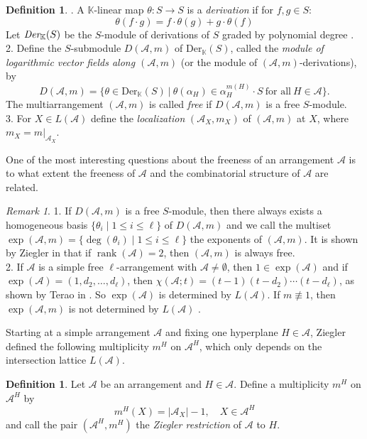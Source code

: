 \documentclass[12pt]{amsart}
\theoremstyle{definition}
\newtheorem{definition}[theorem]{Definition}
\theoremstyle{remark}
\newtheorem{remark}[theorem]{Remark}
\newcommand{\rank}{\operatorname{rank}}
\newcommand\CA{{\mathscr A}}
\begin{document}
\begin{definition}
. A $\mathbb{K}$-linear map $\theta: S \rightarrow S$ is a \emph{derivation} if for $f,g \in S$: \[\theta(f\cdot g) = f\cdot \theta(g)+g\cdot \theta(f)\] Let $\emph{Der}_{\mathbb{K}}(S)$ be the $S$-module of derivations of $S$ graded by polynomial degree \cite[Def.~4.1]{MR1217488}. \\ 2. Define the $S$-submodule $D(\CA,m)$ of $\text{Der}_{\mathbb{K}}(S)$, called the \emph{module of logarithmic vector fields along $(\CA,m)$} (or the module of $(\CA,m)$-derivations), by \[D(\CA,m) = \{\theta \in \text{Der}_{\mathbb{K}}(S)~\vert ~ \theta(\alpha_H)\in \alpha_H^{m(H)}\cdot S~\text{for all}~H\in \CA\}.\]
	The multiarrangement $(\CA,m)$ is called \emph{free} if $D(\CA,m)$ is a free $S$-module.\\
3. For $X\in L(\CA)$ define the \emph{localization} $(\CA_X,m_X)$ of $(\CA,m)$ at $X$, where $m_X=m\vert_{\CA_X}$.
\end{definition}

One of the most interesting questions about the freeness of an arrangement $\CA$ is to what extent the freeness of $\CA$ and the combinatorial structure of $\CA$ are related.
 
 \begin{remark}
 1. If $D(\CA,m)$ is a free $S$-module, then there always exists a homogeneous basis $\{\theta_i\mid 1\leq i\leq \ell\}$ of $D(\CA,m)$ and we call the multiset $\exp(\CA,m)=\{\deg(\theta_i)\mid 1\leq i\leq \ell\}$ the exponents of $(\CA,m)$. It is shown by Ziegler in \cite[Cor.~7]{MR1000610} that if $\rank(\CA)=2$, then $(\CA,m)$ is always free.\\
 2. If $\CA$ is a simple free $\ell$-arrangement with $\CA\neq\emptyset$, then $1\in\exp(\CA)$ \cite[Prop.~4.27]{MR1217488} and if $\exp(\CA)=(1,d_2,\dots,d_\ell)$, then $\chi(\CA;t)=(t-1)(t-d_2)\cdots(t-d_\ell)$, as shown by Terao in \cite{MR0608532}. So $\exp(\CA)$ is determined by $L(\CA)$. If $m\not\equiv 1$, then $\exp(\CA,m)$ is not determined by $L(\CA)$  \cite[Prop.~10]{MR1000610}.
 \end{remark}

Starting at a simple arrangement $\CA$ and fixing one hyperplane $H\in\CA$, Ziegler defined the following multiplicity $m^H$ on $\CA^H$, which only depends on the intersection lattice $L(\CA)$.

\begin{definition}
Let $\CA$ be an arrangement and $H\in\CA$. Define a multiplicity $m^H$ on $\CA^H$ by $$m^H(X)=\vert\CA_X\vert-1,\quad X\in\CA^H$$ and call the pair $(\CA^H,m^H)$ the \emph{Ziegler restriction} of $\CA$ to $H$.
\end{definition} 
\end{document}
